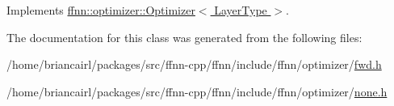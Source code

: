 Implements \hyperlink{classffnn_1_1optimizer_1_1_optimizer_a7c88c2794446e03ccd41628bb25d7a07}{ffnn\-::optimizer\-::\-Optimizer$<$ Layer\-Type $>$}.



The documentation for this class was generated from the following files\-:\begin{DoxyCompactItemize}
\item 
/home/briancairl/packages/src/ffnn-\/cpp/ffnn/include/ffnn/optimizer/\hyperlink{fwd_8h}{fwd.\-h}\item 
/home/briancairl/packages/src/ffnn-\/cpp/ffnn/include/ffnn/optimizer/\hyperlink{none_8h}{none.\-h}\end{DoxyCompactItemize}
